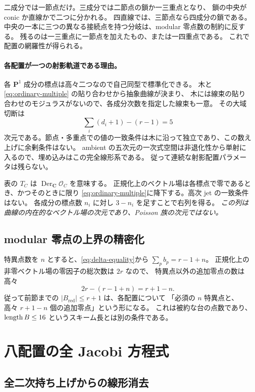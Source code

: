 \documentclass[11pt,a4paper]{ltjsarticle}
\newcommand{\CC}{\mathbf C}\newcommand{\QQ}{\mathbf Q}
\newcommand{\PP}{\mathbf P}\renewcommand{\AA}{\mathbf A}
\newcommand{\OO}{\mathcal O}\newcommand{\FF}{\mathcal F}
\theoremstyle{remark}\newtheorem{remark}[theorem]{注意}
\begin{document}
二成分では一節点だけ。三成分では二節点の鎖か一三重点となり、
鎖の中央が conic か直線かで二つに分かれる。
四直線では、三節点なら四成分の鎖である。
中央の一本に三つの異なる接続点を持つ分岐は、modular 零点数の制約に反する。
残るのは一三重点に一節点を加えたもの、または一四重点である。
これで配置の網羅性が得られる。

\paragraph{各配置が一つの射影軌道である理由。}
各 $\PP^1$ 成分の標点は高々二つなので自己同型で標準化できる。
木と \eqref{eq:ordinary-multiple} の貼り合わせから抽象曲線が決まり、
木には線束の貼り合わせのモジュラスがないので、各成分次数を指定した線束も一意。
その大域切断は
\[
\sum_i(d_i+1)-(r-1)=5
\]
次元である。節点・多重点での値の一致条件は木に沿って独立であり、この数え上げに余剰条件はない。
ambient の五次元の一次式空間は非退化性から単射に入るので、埋め込みはこの完全線形系である。
従って連続な射影配置パラメータは残らない。

表の $T_C$ は $\operatorname{Der}_{\CC}\OO_C$ を意味する。
正規化上のベクトル場は各標点で零であるとき、かつそのときに限り
\eqref{eq:ordinary-multiple}に降下する。高次 jet の一致条件はない。
各成分の標点数 $n_i$ に対し $3-n_i$ を足すことで右列を得る。
\emph{この列は曲線の内在的なベクトル場の次元であり、Poisson 族の次元ではない。}

\subsection{modular 零点の上界の精密化}

特異点数を $n$ とすると、\eqref{eq:delta-equality}から
$\sum_p b_p=r-1+n$。
正規化上の非零ベクトル場の零因子の総次数は $2r$ なので、
特異点以外の追加零点の数は高々
\[
2r-(r-1+n)=r+1-n.
\]
従って前節までの $|B_{\mathrm{red}}|\le r+1$ は、各配置について
「必須の $n$ 特異点と、高々 $r+1-n$ 個の追加零点」という形になる。
これは被約な台の点数であり、$\operatorname{length} B\le16$ というスキーム長とは別の条件である。



\section{八配置の全 Jacobi 方程式}\label{sec:models-v21}

\subsection{全二次持ち上げからの線形消去}
\end{document}
